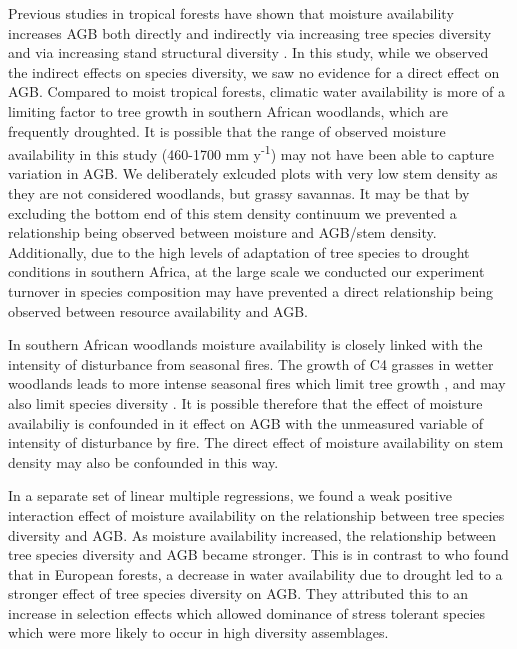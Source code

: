 \documentclass[11pt,a4paper]{article}
\begin{document}
Previous studies in tropical forests have shown that moisture availability increases AGB both directly and indirectly via increasing tree species diversity and via increasing stand structural diversity \citep{Ali2019a, Ali2019b, Poorter2017}. In this study, while we observed the indirect effects on species diversity, we saw no evidence for a direct effect on AGB. Compared to moist tropical forests, climatic water availability is more of a limiting factor to tree growth in southern African woodlands, which are frequently droughted. It is possible that the range of observed moisture availability in this study (\textapprox{}460-1700 mm y\textsuperscript{-1}) may not have been able to capture variation in AGB. We deliberately exlcuded plots with very low stem density as they are not considered woodlands, but grassy savannas. It may be that by excluding the bottom end of this stem density continuum we prevented a relationship being observed between moisture and AGB/stem density. Additionally, due to the high levels of adaptation of tree species to drought conditions in southern Africa, at the large scale we conducted our experiment turnover in species composition may have prevented a direct relationship being observed between resource availability and AGB.

In southern African woodlands moisture availability is closely linked with the intensity of disturbance from seasonal fires. The growth of C4 grasses in wetter woodlands leads to more intense seasonal fires which limit tree growth \citep{Charles-Dominique2018}, and may also limit species diversity \citep{Linder2014}. It is possible therefore that the effect of moisture availabiliy is confounded in it effect on AGB with the unmeasured variable of intensity of disturbance by fire. The direct effect of moisture availability on stem density may also be confounded in this way.

In a separate set of linear multiple regressions, we found a weak positive interaction effect of moisture availability on the relationship between tree species diversity and AGB. As moisture availability increased, the relationship between tree species diversity and AGB became stronger. This is in contrast to \citet{Ratcliffe2017} who found that in European forests, a decrease in water availability due to drought led to a stronger effect of tree species diversity on AGB. They attributed this to an increase in selection effects which allowed dominance of stress tolerant species which were more likely to occur in high diversity assemblages.  
\end{document}

